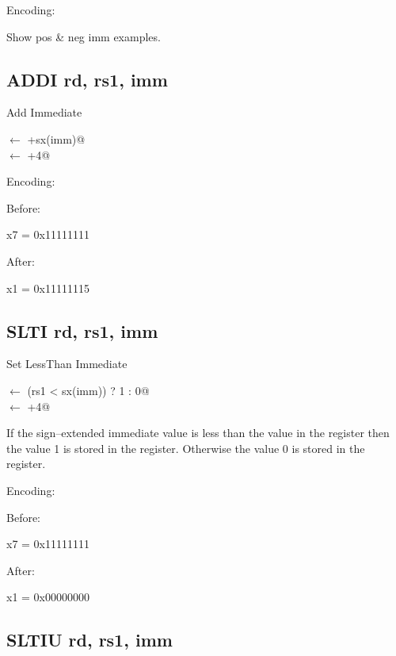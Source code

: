 Encoding:


Show pos \& neg imm examples.

\subsection{ADDI rd, rs1, imm}

Add Immediate

\verb@rd@ $\leftarrow$ +sx(imm)@\\
\verb@pc@ $\leftarrow$ \verb@pc+4@

Encoding:


Before:

x7 = 0x11111111

After:

x1 = 0x11111115

\subsection{SLTI rd, rs1, imm}

Set LessThan Immediate

\verb@rd@ $\leftarrow$ \verb@(rs1 < sx(imm)) ? 1 : 0@\\
\verb@pc@ $\leftarrow$ \verb@pc+4@

If the sign--extended immediate value is less than the value
in the  register then the value 1 is stored in the 
 register.  Otherwise the value 0 is stored in the
 register. 

Encoding:


Before:

x7 = 0x11111111

After:

x1 = 0x00000000

\subsection{SLTIU rd, rs1, imm}

